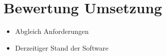 \section{Bewertung Umsetzung}
\begin{itemize}
	\item Abgleich Anforderungen
	\item Derzeitiger Stand der Software
\end{itemize}